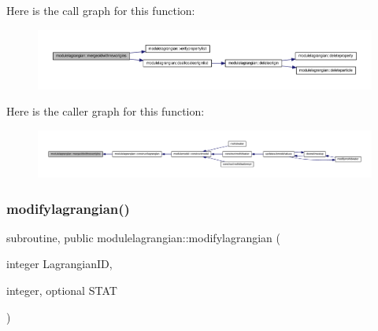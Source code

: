 Here is the call graph for this function\+:\nopagebreak
\begin{figure}[H]
\begin{center}
\leavevmode
\includegraphics[width=350pt]{namespacemodulelagrangian_aec5a7d886f857814caf3bbd5957b5359_cgraph}
\end{center}
\end{figure}
Here is the caller graph for this function\+:\nopagebreak
\begin{figure}[H]
\begin{center}
\leavevmode
\includegraphics[width=350pt]{namespacemodulelagrangian_aec5a7d886f857814caf3bbd5957b5359_icgraph}
\end{center}
\end{figure}
\mbox{\label{namespacemodulelagrangian_a1097f962a7a848d12f7f3036993f7b93}} 
\subsubsection{\texorpdfstring{modifylagrangian()}{modifylagrangian()}}
{\footnotesize\ttfamily subroutine, public modulelagrangian\+::modifylagrangian (\begin{DoxyParamCaption}\item[{integer}]{Lagrangian\+ID,  }\item[{integer, optional}]{S\+T\+AT }\end{DoxyParamCaption})}

